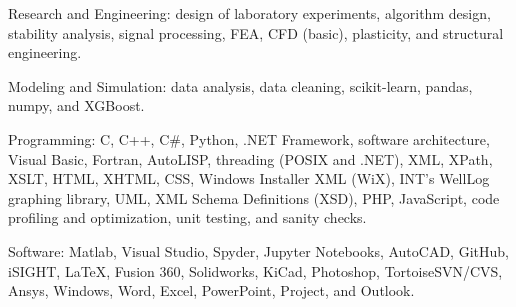 \documentclass{leresume}
\begin{document}
    \begin{bulletedlist}
		
		\item Research and Engineering: design of laboratory experiments,
                        algorithm design,
                        stability analysis,
                        signal processing,
                        FEA,
                        CFD (basic),
                        plasticity,
                        and structural engineering.
                        
		\item Modeling and Simulation: data analysis,
                        data cleaning,
                        scikit-learn,
                        pandas,
                        numpy,
                        and XGBoost.
                        
		\item Programming: C,
                        C++,
                        C\#,
                        Python,
                        .NET Framework,
                        software architecture,
                        Visual Basic,
                        Fortran,
                        AutoLISP,
                        threading (POSIX and .NET),
                        XML,
                        XPath,
                        XSLT,
                        HTML,
                        XHTML,
                        CSS,
                        Windows Installer XML (WiX),
                        INT's WellLog graphing library,
                        UML,
                        XML Schema Definitions (XSD),
                        PHP,
                        JavaScript,
                        code profiling and optimization,
                        unit testing,
                        and sanity checks.
                        
		\item Software: Matlab,
                        Visual Studio,
                        Spyder,
                        Jupyter Notebooks,
                        AutoCAD,
                        GitHub,
                        iSIGHT,
                        LaTeX,
                        Fusion 360,
                        Solidworks,
                        KiCad,
                        Photoshop,
                        TortoiseSVN/CVS,
                        Ansys,
                        Windows,
                        Word,
                        Excel,
                        PowerPoint,
                        Project,
                        and Outlook.
                        

\end{bulletedlist}
\end{document}

